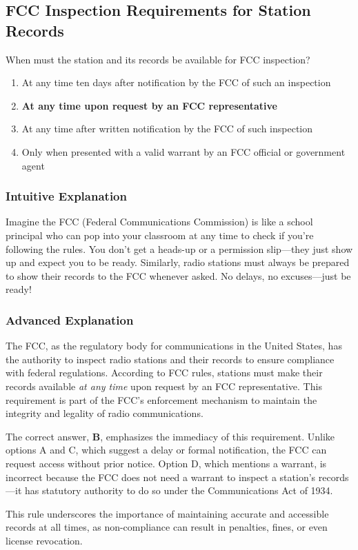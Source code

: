 \subsection{FCC Inspection Requirements for Station Records}
\label{T1F01}

\begin{tcolorbox}[colback=gray!10!white,colframe=black!75!black,title=T1F01]
When must the station and its records be available for FCC inspection?
\begin{enumerate}[label=\Alph*)]
    \item At any time ten days after notification by the FCC of such an inspection
    \item \textbf{At any time upon request by an FCC representative}
    \item At any time after written notification by the FCC of such inspection
    \item Only when presented with a valid warrant by an FCC official or government agent
\end{enumerate}
\end{tcolorbox}

\subsubsection{Intuitive Explanation}
Imagine the FCC (Federal Communications Commission) is like a school principal who can pop into your classroom at any time to check if you're following the rules. You don’t get a heads-up or a permission slip—they just show up and expect you to be ready. Similarly, radio stations must always be prepared to show their records to the FCC whenever asked. No delays, no excuses—just be ready!

\subsubsection{Advanced Explanation}
The FCC, as the regulatory body for communications in the United States, has the authority to inspect radio stations and their records to ensure compliance with federal regulations. According to FCC rules, stations must make their records available \textit{at any time} upon request by an FCC representative. This requirement is part of the FCC's enforcement mechanism to maintain the integrity and legality of radio communications. 

The correct answer, \textbf{B}, emphasizes the immediacy of this requirement. Unlike options A and C, which suggest a delay or formal notification, the FCC can request access without prior notice. Option D, which mentions a warrant, is incorrect because the FCC does not need a warrant to inspect a station’s records—it has statutory authority to do so under the Communications Act of 1934.

This rule underscores the importance of maintaining accurate and accessible records at all times, as non-compliance can result in penalties, fines, or even license revocation.

